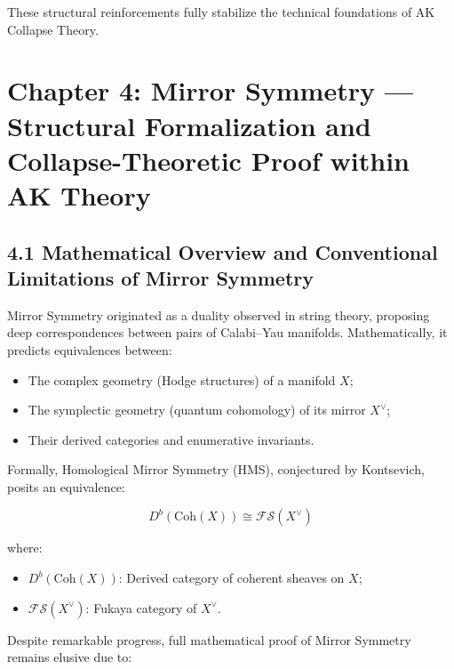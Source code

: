 \documentclass[11pt]{article}
\begin{document}
These structural reinforcements fully stabilize the technical foundations of AK Collapse Theory.

\FloatBarrier




\section{Chapter 4: Mirror Symmetry — Structural Formalization and Collapse-Theoretic Proof within AK Theory}

\subsection{4.1 Mathematical Overview and Conventional Limitations of Mirror Symmetry}

Mirror Symmetry originated as a duality observed in string theory, proposing deep correspondences between pairs of Calabi–Yau manifolds. Mathematically, it predicts equivalences between:

\begin{itemize}
    \item The complex geometry (Hodge structures) of a manifold $X$;
    \item The symplectic geometry (quantum cohomology) of its mirror $X^\vee$;
    \item Their derived categories and enumerative invariants.
\end{itemize}

Formally, Homological Mirror Symmetry (HMS), conjectured by Kontsevich, posits an equivalence:

\begin{equation}
D^b(\mathrm{Coh}(X)) \cong \mathcal{F}\mathcal{S}(X^\vee)
\end{equation}

where:

\begin{itemize}
    \item $D^b(\mathrm{Coh}(X))$: Derived category of coherent sheaves on $X$;
    \item $\mathcal{F}\mathcal{S}(X^\vee)$: Fukaya category of $X^\vee$.
\end{itemize}

Despite remarkable progress, full mathematical proof of Mirror Symmetry remains elusive due to:
\end{document}
